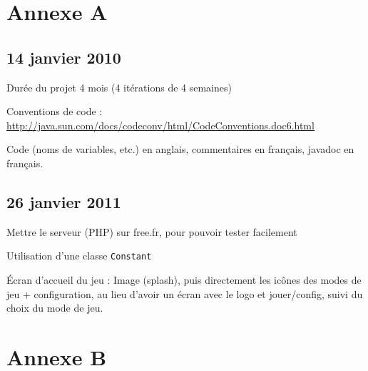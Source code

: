 \documentclass[a4paper,11pt,french]{article}
\begin{document}
\appendix

\section{Annexe A}


\subsection{14 janvier 2010}


Durée du projet 4 mois (4 itérations de 4 semaines)

Conventions de code : \url{http://java.sun.com/docs/codeconv/html/CodeConventions.doc6.html}

Code (noms de variables, etc.) en anglais, commentaires en français, javadoc en français.

\subsection{26 janvier 2011}
Mettre le serveur (PHP) sur free.fr, pour pouvoir tester facilement

Utilisation d'une classe \verb!Constant!

Écran d'accueil du jeu : Image (splash), puis directement les icônes des modes de jeu + configuration, au lieu d'avoir un écran avec le logo et jouer/config, suivi du choix du mode de jeu.

\section{Annexe B}
\end{document}
